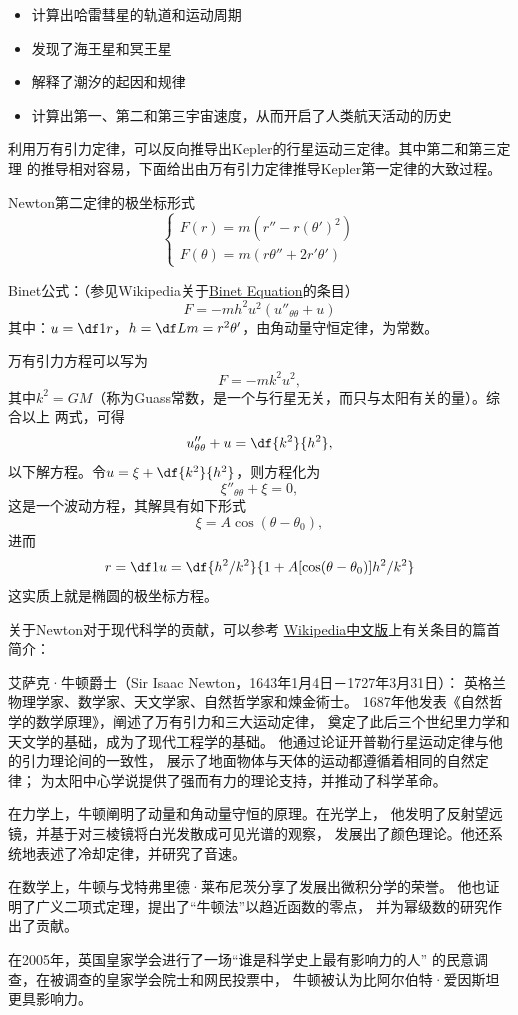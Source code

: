 \begin{shaded}
	\begin{itemize}
		\setlength{\itemindent}{2em}
		\item 计算出哈雷彗星的轨道和运动周期
		\item 发现了海王星和冥王星
		\item 解释了潮汐的起因和规律
		\item 计算出第一、第二和第三宇宙速度，从而开启了人类航天活动的历史
	\end{itemize}
	
	利用万有引力定律，可以反向推导出Kepler的行星运动三定律。其中第二和第三定理
	的推导相对容易，下面给出由万有引力定律推导Kepler第一定律的大致过程。
	
	Newton第二定律的极坐标形式
	$$
	\left\{\begin{array}{l}
		F(r)=m(r''-r(\theta')^2)\\
		F(\theta)=m(r\theta''+2r'\theta')
	\end{array}\right.
	$$
	
	Binet公式：（参见Wikipedia关于\href{https://en.wikipedia.org/wiki/Binet_equation}{Binet Equation}的条目）
	$$F=-mh^2u^2\left(u''_{\theta\theta}+u\right)$$
	其中：$u=\df1r$，$h=\df Lm=r^2\theta'$，由角动量守恒定律，为常数。
	
	万有引力方程可以写为
	$$F=-mk^2u^2,$$
	其中$k^2=GM$（称为{\kaishu Guass常数}，是一个与行星无关，而只与太阳有关的量）。综合以上
	两式，可得
	$$u''_{\theta\theta}+u=\df{k^2}{h^2},$$
	以下解方程。令$u=\xi+\df{k^2}{h^2}$，则方程化为
	$$\xi''_{\theta\theta}+\xi=0,$$
	这是一个波动方程，其解具有如下形式
	$$\xi=A\cos(\theta-\theta_0),$$
	进而
	$$r=\df1u=\df{h^2/k^2}{1+A[\cos(\theta-\theta_0)]h^2/k^2}$$
	这实质上就是椭圆的极坐标方程。

	关于Newton对于现代科学的贡献，可以参考
	\href{https://zh.wikipedia.org/wiki/艾萨克·牛顿}
	{Wikipedia中文版}上有关条目的篇首简介：

	{\kaishu
	艾萨克·牛顿爵士（Sir Isaac Newton，1643年1月4日－1727年3月31日）：
	英格兰物理学家、数学家、天文学家、自然哲学家和煉金術士。
	1687年他发表《自然哲学的数学原理》，阐述了万有引力和三大运动定律，
	奠定了此后三个世纪里力学和天文学的基础，成为了现代工程学的基础。
	他通过论证开普勒行星运动定律与他的引力理论间的一致性，
	展示了地面物体与天体的运动都遵循着相同的自然定律；
	为太阳中心学说提供了强而有力的理论支持，并推动了科学革命。

	在力学上，牛顿阐明了动量和角动量守恒的原理。在光学上，
	他发明了反射望远镜，并基于对三棱镜将白光发散成可见光谱的观察，
	发展出了颜色理论。他还系统地表述了冷却定律，并研究了音速。

	在数学上，牛顿与戈特弗里德·莱布尼茨分享了发展出微积分学的荣誉。
	他也证明了广义二项式定理，提出了“牛顿法”以趋近函数的零点，
	并为幂级数的研究作出了贡献。

	在2005年，英国皇家学会进行了一场“谁是科学史上最有影响力的人”
	的民意调查，在被调查的皇家学会院士和网民投票中，
	牛顿被认为比阿尔伯特·爱因斯坦更具影响力。}
\end{shaded}

